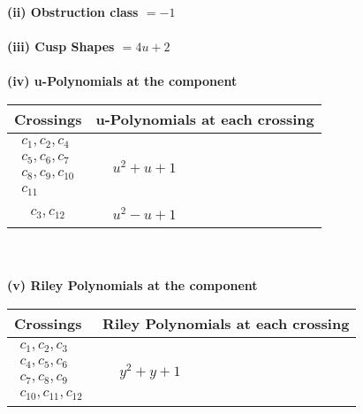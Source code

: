 \documentclass[1p]{elsarticle_modified}
\theoremstyle{definition}
\begin{document}
\flushleft \textbf{(ii) Obstruction class $= -1$}\\~\\
\flushleft \textbf{(iii) Cusp Shapes $= 4 u+2$}\\~\\
\newpage\renewcommand{\arraystretch}{1}
\flushleft \textbf{(iv) u-Polynomials at the component}\newline \\
\begin{tabular}{m{50pt}|m{274pt}}
Crossings & \hspace{64pt}u-Polynomials at each crossing \\
\hline $$\begin{aligned}c_{1},c_{2},c_{4}\\c_{5},c_{6},c_{7}\\c_{8},c_{9},c_{10}\\c_{11}\end{aligned}$$&$\begin{aligned}
&u^2+u+1
\end{aligned}$\\
\hline $$\begin{aligned}c_{3},c_{12}\end{aligned}$$&$\begin{aligned}
&u^2- u+1
\end{aligned}$\\
\hline
\end{tabular}\\~\\
\newpage\renewcommand{\arraystretch}{1}
\flushleft \textbf{(v) Riley Polynomials at the component}\newline \\
\begin{tabular}{m{50pt}|m{274pt}}
Crossings & \hspace{64pt}Riley Polynomials at each crossing \\
\hline $$\begin{aligned}c_{1},c_{2},c_{3}\\c_{4},c_{5},c_{6}\\c_{7},c_{8},c_{9}\\c_{10},c_{11},c_{12}\end{aligned}$$&$\begin{aligned}
&y^2+y+1
\end{aligned}$\\
\hline
\end{tabular}\\~\\
\end{document}
